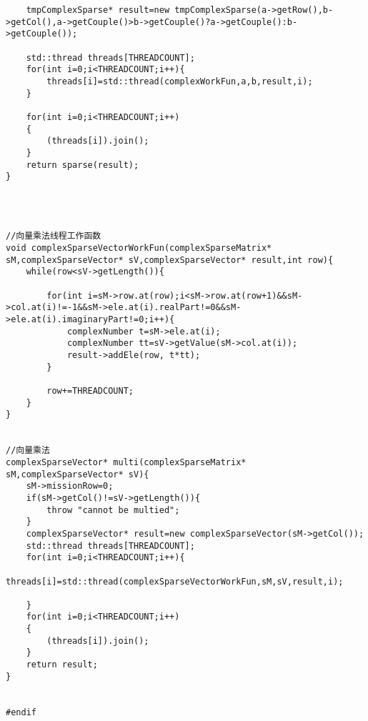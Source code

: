 \begin{lstlisting}
    tmpComplexSparse* result=new tmpComplexSparse(a->getRow(),b->getCol(),a->getCouple()>b->getCouple()?a->getCouple():b->getCouple());
    
    std::thread threads[THREADCOUNT];
    for(int i=0;i<THREADCOUNT;i++){
        threads[i]=std::thread(complexWorkFun,a,b,result,i);
    }
    
    for(int i=0;i<THREADCOUNT;i++)
    {
        (threads[i]).join();
    }
    return sparse(result);
}




//向量乘法线程工作函数
void complexSparseVectorWorkFun(complexSparseMatrix* sM,complexSparseVector* sV,complexSparseVector* result,int row){
    while(row<sV->getLength()){
        
        for(int i=sM->row.at(row);i<sM->row.at(row+1)&&sM->col.at(i)!=-1&&sM->ele.at(i).realPart!=0&&sM->ele.at(i).imaginaryPart!=0;i++){
            complexNumber t=sM->ele.at(i);
            complexNumber tt=sV->getValue(sM->col.at(i));
            result->addEle(row, t*tt);
        }
    
        row+=THREADCOUNT;
    }
}


//向量乘法
complexSparseVector* multi(complexSparseMatrix* sM,complexSparseVector* sV){
    sM->missionRow=0;
    if(sM->getCol()!=sV->getLength()){
        throw "cannot be multied";
    }
    complexSparseVector* result=new complexSparseVector(sM->getCol());
    std::thread threads[THREADCOUNT];
    for(int i=0;i<THREADCOUNT;i++){
        threads[i]=std::thread(complexSparseVectorWorkFun,sM,sV,result,i);
        
    }
    for(int i=0;i<THREADCOUNT;i++)
    {
        (threads[i]).join();
    }
    return result;
}


#endif

\end{lstlisting}

